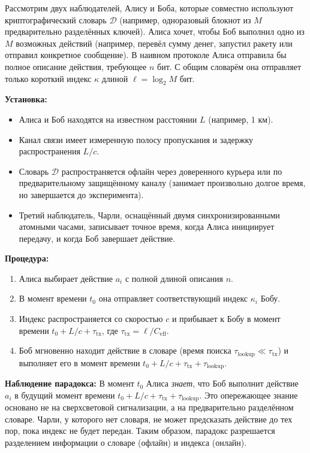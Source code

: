 \documentclass[12pt]{article}
\begin{document}
	Рассмотрим двух наблюдателей, Алису и Боба, которые совместно используют криптографический словарь \( \mathcal{D} \) (например, одноразовый блокнот из \(M\) предварительно разделённых ключей). Алиса хочет, чтобы Боб выполнил одно из \(M\) возможных действий (например, перевёл сумму денег, запустил ракету или отправил конкретное сообщение). В наивном протоколе Алиса отправила бы полное описание действия, требующее \(n\) бит. С общим словарём она отправляет только короткий индекс \(\kappa\) длиной \(\ell = \log_2 M\) бит.
	
	\textbf{Установка:}
	\begin{itemize}
		\item Алиса и Боб находятся на известном расстоянии \(L\) (например, 1 км).
		\item Канал связи имеет измеренную полосу пропускания и задержку распространения \(L/c\).
		\item Словарь \(\mathcal{D}\) распространяется офлайн через доверенного курьера или по предварительному защищённому каналу (занимает произвольно долгое время, но завершается до эксперимента).
		\item Третий наблюдатель, Чарли, оснащённый двумя синхронизированными атомными часами, записывает точное время, когда Алиса инициирует передачу, и когда Боб завершает действие.
	\end{itemize}
	
	\textbf{Процедура:}
	\begin{enumerate}
		\item Алиса выбирает действие \(a_i\) с полной длиной описания \(n\).
		\item В момент времени \(t_0\) она отправляет соответствующий индекс \(\kappa_i\) Бобу.
		\item Индекс распространяется со скоростью \(c\) и прибывает к Бобу в момент времени \(t_0 + L/c + \tau_{\text{tx}}\), где \(\tau_{\text{tx}} = \ell / C_{\text{eff}}\).
		\item Боб мгновенно находит действие в словаре (время поиска \(\tau_{\text{lookup}} \ll \tau_{\text{tx}}\)) и выполняет его в момент времени \(t_0 + L/c + \tau_{\text{tx}} + \tau_{\text{lookup}}\).
	\end{enumerate}
	
	\textbf{Наблюдение парадокса:}
	В момент \(t_0\) Алиса \emph{знает}, что Боб выполнит действие \(a_i\) в будущий момент времени \(t_0 + L/c + \tau_{\text{tx}} + \tau_{\text{lookup}}\). Это опережающее знание основано не на сверхсветовой сигнализации, а на предварительно разделённом словаре. Чарли, у которого нет словаря, не может предсказать действие до тех пор, пока индекс не будет передан. Таким образом, парадокс разрешается разделением информации о словаре (офлайн) и индекса (онлайн).
	
\end{document}

